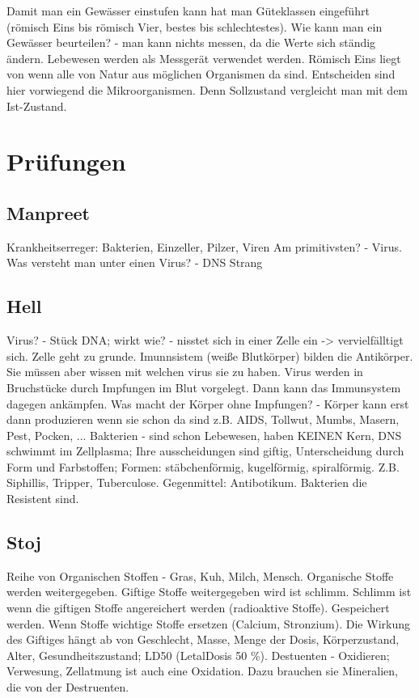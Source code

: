 \documentclass[a4paper]{article}
\begin{document}
Damit man ein Gewässer einstufen kann hat man Güteklassen eingeführt (römisch Eins bis römisch Vier, bestes bis schlechtestes). Wie kann man ein Gewässer beurteilen? - man kann nichts messen, da die Werte sich ständig ändern. Lebewesen werden als Messgerät verwendet werden. Römisch Eins liegt von wenn alle von Natur aus möglichen Organismen da sind. Entscheiden sind hier vorwiegend die Mikroorganismen. Denn Sollzustand vergleicht man mit dem Ist-Zustand.

\section{Prüfungen}

\subsection{Manpreet}

Krankheitserreger: Bakterien, Einzeller, Pilzer, Viren
Am primitivsten? - Virus. Was versteht man unter einen Virus? - DNS Strang

\subsection{Hell}

Virus? - Stück DNA; wirkt wie? - nisstet sich in einer Zelle ein -> vervielfälltigt sich. Zelle geht zu grunde. Imunnsistem (weiße Blutkörper) bilden die Antikörper. Sie müssen aber wissen mit welchen virus sie zu haben. Virus werden in Bruchstücke durch Impfungen im Blut vorgelegt. Dann kann das Immunsystem dagegen ankämpfen. Was macht der Körper ohne Impfungen? - Körper kann erst dann produzieren wenn sie schon da sind z.B. AIDS, Tollwut, Mumbs, Masern, Pest, Pocken, ... Bakterien - sind schon Lebewesen, haben KEINEN Kern, DNS schwimmt im Zellplasma; Ihre ausscheidungen sind giftig, Unterscheidung durch Form und Farbstoffen; Formen: stäbchenförmig, kugelförmig, spiralförmig. Z.B. Siphillis, Tripper, Tuberculose. Gegenmittel: Antibotikum. Bakterien die Resistent sind.

\subsection{Stoj}

Reihe von Organischen Stoffen - Gras, Kuh, Milch, Mensch. Organische Stoffe werden weitergegeben. 
Giftige Stoffe weitergegeben wird ist schlimm. Schlimm ist wenn die giftigen Stoffe angereichert werden (radioaktive Stoffe). Gespeichert werden. Wenn Stoffe wichtige Stoffe ersetzen (Calcium, Stronzium). Die Wirkung des Giftiges hängt ab von Geschlecht,  Masse, Menge der Dosis, Körperzustand, Alter, Gesundheitszustand; LD50 (LetalDosis 50 \%).
\newline
\newline
Destuenten - Oxidieren; Verwesung, 
Zellatmung ist auch eine Oxidation. Dazu brauchen sie Mineralien, die von der Destruenten.
\end{document}
